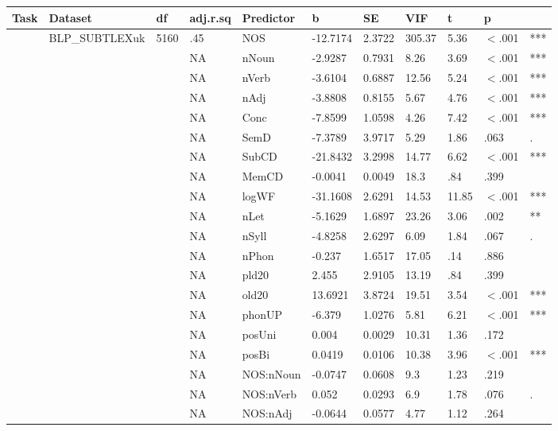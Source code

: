 \begin{table}[ht]
\centering
\begingroup\normalsize
\begin{tabular}{lllllllllll}
  \hline
Task & Dataset & df & adj.r.sq & Predictor & b & SE & VIF & t & p &  \\ 
  \hline
 & BLP\_SUBTLEXuk & 5160 & .45 & NOS & -12.7174 & 2.3722 & 305.37 & 5.36 & $<$.001 & *** \\ 
   &  &  & NA & nNoun & -2.9287 & 0.7931 & 8.26 & 3.69 & $<$.001 & *** \\ 
   &  &  & NA & nVerb & -3.6104 & 0.6887 & 12.56 & 5.24 & $<$.001 & *** \\ 
   &  &  & NA & nAdj & -3.8808 & 0.8155 & 5.67 & 4.76 & $<$.001 & *** \\ 
   &  &  & NA & Conc & -7.8599 & 1.0598 & 4.26 & 7.42 & $<$.001 & *** \\ 
   &  &  & NA & SemD & -7.3789 & 3.9717 & 5.29 & 1.86 & .063 & . \\ 
   &  &  & NA & SubCD & -21.8432 & 3.2998 & 14.77 & 6.62 & $<$.001 & *** \\ 
   &  &  & NA & MemCD & -0.0041 & 0.0049 & 18.3 & .84 & .399 &   \\ 
   &  &  & NA & logWF & -31.1608 & 2.6291 & 14.53 & 11.85 & $<$.001 & *** \\ 
   &  &  & NA & nLet & -5.1629 & 1.6897 & 23.26 & 3.06 & .002 & ** \\ 
   &  &  & NA & nSyll & -4.8258 & 2.6297 & 6.09 & 1.84 & .067 & . \\ 
   &  &  & NA & nPhon & -0.237 & 1.6517 & 17.05 & .14 & .886 &   \\ 
   &  &  & NA & pld20 & 2.455 & 2.9105 & 13.19 & .84 & .399 &   \\ 
   &  &  & NA & old20 & 13.6921 & 3.8724 & 19.51 & 3.54 & $<$.001 & *** \\ 
   &  &  & NA & phonUP & -6.379 & 1.0276 & 5.81 & 6.21 & $<$.001 & *** \\ 
   &  &  & NA & posUni & 0.004 & 0.0029 & 10.31 & 1.36 & .172 &   \\ 
   &  &  & NA & posBi & 0.0419 & 0.0106 & 10.38 & 3.96 & $<$.001 & *** \\ 
   &  &  & NA & NOS:nNoun & -0.0747 & 0.0608 & 9.3 & 1.23 & .219 &   \\ 
   &  &  & NA & NOS:nVerb & 0.052 & 0.0293 & 6.9 & 1.78 & .076 & . \\ 
   &  &  & NA & NOS:nAdj & -0.0644 & 0.0577 & 4.77 & 1.12 & .264 &   \\ 

\end{tabular}
\end{table}
